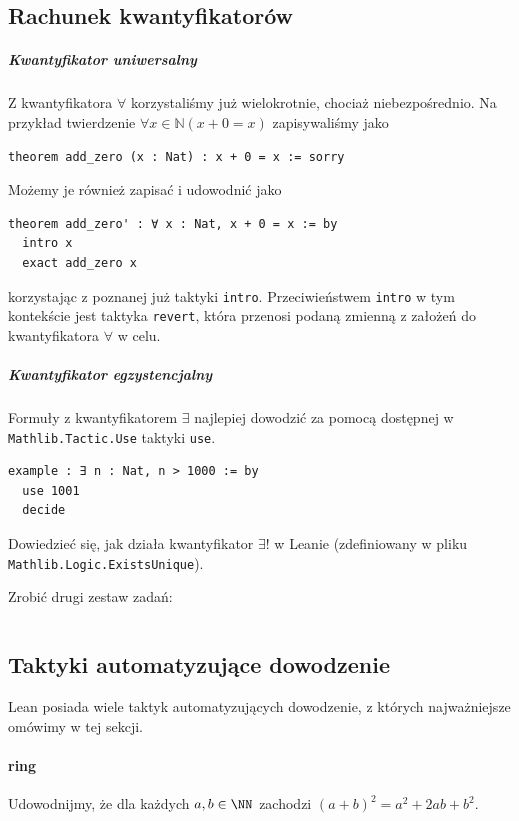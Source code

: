 \documentclass[polish,pretty,bibliography=totocnumbered]{angav}
\newcommand{\Lean}[1]{\texttt{#1}}
\begin{document}
\subsection{Rachunek kwantyfikatorów}

\subparagraph{Kwantyfikator uniwersalny}
Z kwantyfikatora $\forall$ korzystaliśmy już wielokrotnie, chociaż niebezpośrednio. Na przykład twierdzenie $\forall x \in \mathbb{N} (x + 0 = x)$ zapisywaliśmy jako
\begin{verbatim}
theorem add_zero (x : Nat) : x + 0 = x := sorry
\end{verbatim}
Możemy je również zapisać i udowodnić jako
\begin{verbatim}
theorem add_zero' : ∀ x : Nat, x + 0 = x := by
  intro x
  exact add_zero x
\end{verbatim}
korzystając z poznanej już taktyki \Lean{intro}. Przeciwieństwem \Lean{intro} w tym kontekście jest taktyka \Lean{revert}, która przenosi podaną zmienną z założeń do kwantyfikatora $\forall$ w celu.

\subparagraph{Kwantyfikator egzystencjalny}
Formuły z kwantyfikatorem $\exists$ najlepiej dowodzić za pomocą dostępnej w \Lean{Mathlib.Tactic.Use} taktyki \Lean{use}.
\begin{verbatim}
example : ∃ n : Nat, n > 1000 := by
  use 1001
  decide
\end{verbatim}

\begin{problem}
    Dowiedzieć się, jak działa kwantyfikator $\exists!$ w Leanie (zdefiniowany w pliku \Lean{Mathlib.Logic.ExistsUnique}).
\end{problem}

\begin{problem}
    Zrobić drugi zestaw zadań:
    \inputminted{lean4}{problemsets/problemset02.lean}
\end{problem}

\subsection{Taktyki automatyzujące dowodzenie}

Lean posiada wiele taktyk automatyzujących dowodzenie, z których najważniejsze omówimy w tej sekcji.

\paragraph{ring}
Udowodnijmy, że dla każdych $a, b \in \NN$ zachodzi $(a + b)^2 = a^2 + 2ab + b^2$.
\end{document}
